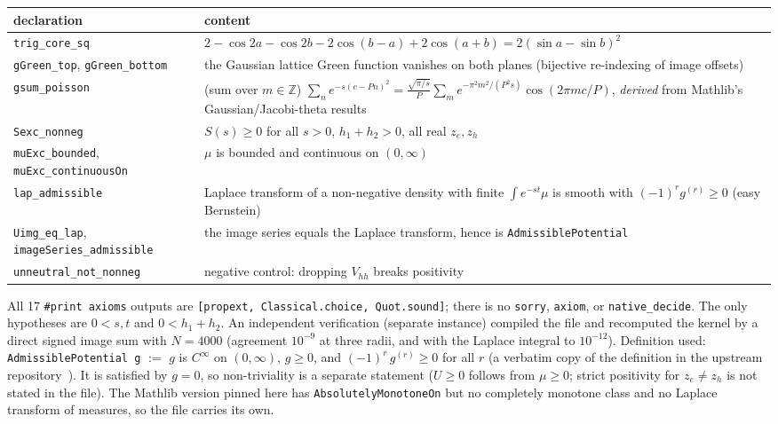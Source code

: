 \documentclass[11pt,a4paper]{article}
\theoremstyle{remark}
\newcommand{\Z}{\mathbb{Z}}
\begin{document}
\begin{center}\small
\begin{tabular}{@{}p{}p{}@{}}
\toprule
declaration & content \\ \midrule
\texttt{trig\_core\_sq} & $2-\cos2a-\cos2b-2\cos(b-a)+2\cos(a+b)=2(\sin a-\sin b)^2$ \\
\texttt{gGreen\_top}, \texttt{gGreen\_bottom} & the Gaussian lattice Green function vanishes on both planes (bijective re-indexing of image offsets) \\
\texttt{gsum\_poisson} & (sum over $m\in\Z$) $\sum_ne^{-s(c-Pn)^2}=\frac{\sqrt{\pi/s}}P\sum_me^{-\pi^2m^2/(P^2s)}\cos(2\pi mc/P)$, \emph{derived} from Mathlib's Gaussian/Jacobi-theta results \\
\texttt{Sexc\_nonneg} & $S(s)\ge0$ for all $s>0$, $h_1+h_2>0$, all real $z_e,z_h$ \\
\texttt{muExc\_bounded}, \texttt{muExc\_continuousOn} & $\mu$ is bounded and continuous on $(0,\infty)$ \\
\texttt{lap\_admissible} & Laplace transform of a non-negative density with finite $\int e^{-st}\mu$ is smooth with $(-1)^rg^{(r)}\ge0$ (easy Bernstein) \\
\texttt{Uimg\_eq\_lap}, \texttt{imageSeries\_admissible} & the image series equals the Laplace transform, hence is \texttt{AdmissiblePotential} \\
\texttt{unneutral\_not\_nonneg} & negative control: dropping $V_{hh}$ breaks positivity \\
\bottomrule
\end{tabular}
\end{center}

All 17 \texttt{\#print axioms} outputs are \texttt{[propext, Classical.choice, Quot.sound]}; there is no \texttt{sorry}, \texttt{axiom}, or
\texttt{native\_decide}. The only hypotheses are $0<s,t$ and $0<h_1+h_2$. An independent verification (separate instance) compiled the file and recomputed the
kernel by a direct signed image sum with $N=4000$ (agreement $10^{-9}$ at three radii, and with the Laplace integral to $10^{-12}$).
Definition used: \texttt{AdmissiblePotential g} $:=$ $g$ is $C^\infty$ on $(0,\infty)$, $g\ge0$, and $(-1)^r\,g^{(r)}\ge0$ for all $r$ (a
verbatim copy of the definition in the upstream repository~\cite{OpenAI2026}). It is satisfied by $g=0$, so non-triviality is a separate statement
($U\ge0$ follows from $\mu\ge0$; strict positivity for $z_e\ne z_h$ is not stated in the file). The Mathlib version pinned here has
\texttt{AbsolutelyMonotoneOn} but no completely monotone class and no Laplace transform of measures, so the file carries its own.
\end{document}
